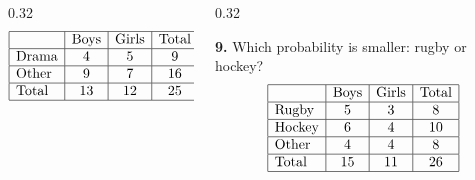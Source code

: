 \documentclass[aspectratio=169,12pt]{beamer}
\newcommand{\MMProblem}[2]{\begin{MMProblemCard}\raggedright\small\textbf{#1.} #2\par\end{MMProblemCard}}
\begin{document}
\begin{frame}[t]
\begin{columns}[T,onlytextwidth]
\begin{column}{0.32\textwidth}
{\[
\begin{array}{|l|c|c|c|}
\hline
 & \text{Boys} & \text{Girls} & \text{Total} \\\hline
\text{Drama} & 4 & 5 & 9 \\\hline
\text{Other} & 9 & 7 & 16 \\\hline
\text{Total} & 13 & 12 & 25 \\\hline
\end{array}
\]}\end{column}
\begin{column}{0.32\textwidth}\MMProblem{9}{Which probability is smaller: rugby or hockey?
\[
\begin{array}{|l|c|c|c|}
\hline
 & \text{Boys} & \text{Girls} & \text{Total} \\\hline
\text{Rugby} & 5 & 3 & 8 \\\hline
\text{Hockey} & 6 & 4 & 10 \\\hline
\text{Other} & 4 & 4 & 8 \\\hline
\text{Total} & 15 & 11 & 26 \\\hline
\end{array}
\]}\end{column}
\end{columns}
\end{frame}
\end{document}
